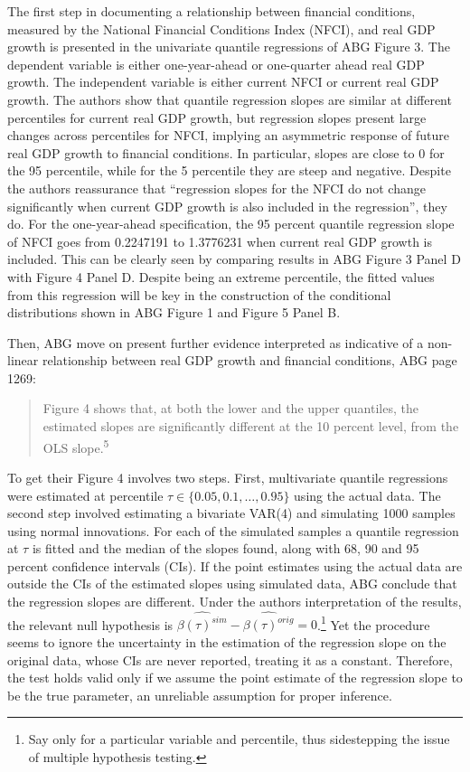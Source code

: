 \documentclass[11pt,]{article}
\let\rmarkdownfootnote\footnote%
\def\footnote{\protect\rmarkdownfootnote}
\begin{document}
The first step in documenting a relationship between financial
conditions, measured by the National Financial Conditions Index (NFCI),
and real GDP growth is presented in the univariate quantile regressions
of ABG Figure 3. The dependent variable is either one-year-ahead or
one-quarter ahead real GDP growth. The independent variable is either
current NFCI or current real GDP growth. The authors show that quantile
regression slopes are similar at different percentiles for current real
GDP growth, but regression slopes present large changes across
percentiles for NFCI, implying an asymmetric response of future real GDP
growth to financial conditions. In particular, slopes are close to 0 for
the 95 percentile, while for the 5 percentile they are steep and
negative. Despite the authors reassurance that ``regression slopes for
the NFCI do not change significantly when current GDP growth is also
included in the regression'', they do. For the one-year-ahead
specification, the 95 percent quantile regression slope of NFCI goes
from 0.2247191 to 1.3776231 when current real GDP growth is included.
This can be clearly seen by comparing results in ABG Figure 3 Panel D
with Figure 4 Panel D. Despite being an extreme percentile, the fitted
values from this regression will be key in the construction of the
conditional distributions shown in ABG Figure 1 and Figure 5 Panel B.

Then, ABG move on present further evidence interpreted as indicative of
a non-linear relationship between real GDP growth and financial
conditions, ABG page 1269:

\begin{quote}
Figure 4 shows that, at both the lower and the upper quantiles, the
estimated slopes are significantly different at the 10 percent level,
from the OLS slope.\textsuperscript{5}
\end{quote}

To get their Figure 4 involves two steps. First, multivariate quantile
regressions were estimated at percentile
\(\tau \in \{0.05, 0.1,\dots, 0.95\}\) using the actual data. The second
step involved estimating a bivariate VAR(4) and simulating 1000 samples
using normal innovations. For each of the simulated samples a quantile
regression at \(\tau\) is fitted and the median of the slopes found,
along with 68, 90 and 95 percent confidence intervals (CIs). If the
point estimates using the actual data are outside the CIs of the
estimated slopes using simulated data, ABG conclude that the regression
slopes are different. Under the authors interpretation of the results,
the relevant null hypothesis is
\(\widehat{\beta(\tau)^{sim}} - \widehat{\beta(\tau)^{orig}} = 0\).\footnote{Say only for a particular variable and percentile, thus sidestepping the issue of multiple hypothesis testing.}
Yet the procedure seems to ignore the uncertainty in the estimation of
the regression slope on the original data, whose CIs are never reported,
treating it as a constant. Therefore, the test holds valid only if we
assume the point estimate of the regression slope to be the true
parameter, an unreliable assumption for proper inference.
\end{document}
